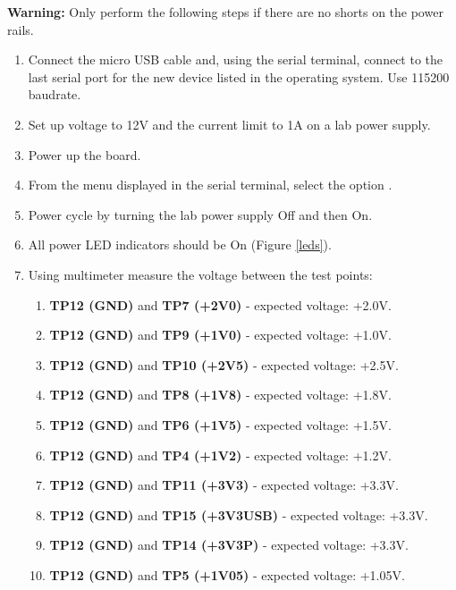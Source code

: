 \documentclass[12pt,oneside,a4]{article}
\begin{document}
\textbf{Warning:} Only perform the following steps if there are no shorts on the power rails.
\begin{enumerate}
    \item Connect the micro USB cable and, using the serial terminal, connect to the last serial port for the new device listed in the operating system. Use 115200 baudrate.
    \item Set up voltage to 12V and the current limit to 1A on a lab power supply.
    \item Power up the board.
    \item From the menu displayed in the serial terminal, select the option .
    \item Power cycle by turning the lab power supply Off and then On.
    \item All power LED indicators should be On (Figure \ref{leds}).
    \item Using multimeter measure the voltage between the test points:
    \begin{enumerate}
    	\item \textbf{TP12 (GND)} and \textbf{TP7 (+2V0)} - expected voltage: +2.0V.
    	\item \textbf{TP12 (GND)} and \textbf{TP9 (+1V0)} - expected voltage: +1.0V.
    	\item \textbf{TP12 (GND)} and \textbf{TP10 (+2V5)} - expected voltage: +2.5V.
    	\item \textbf{TP12 (GND)} and \textbf{TP8 (+1V8)} - expected voltage: +1.8V.
    	\item \textbf{TP12 (GND)} and \textbf{TP6 (+1V5)} - expected voltage: +1.5V.
    	\item \textbf{TP12 (GND)} and \textbf{TP4 (+1V2)} - expected voltage: +1.2V.
    	\item \textbf{TP12 (GND)} and \textbf{TP11 (+3V3)} - expected voltage: +3.3V.
    	\item \textbf{TP12 (GND)} and \textbf{TP15 (+3V3USB)} - expected voltage: +3.3V.
    	\item \textbf{TP12 (GND)} and \textbf{TP14 (+3V3P)} - expected voltage: +3.3V.
    	\item \textbf{TP12 (GND)} and \textbf{TP5 (+1V05)} - expected voltage: +1.05V.
\end{enumerate}
\end{enumerate}
\end{document}
